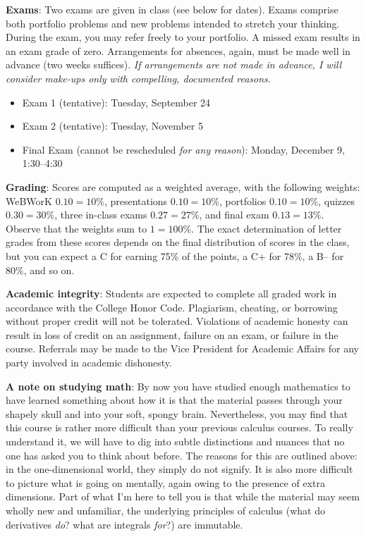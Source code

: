 \documentclass[12pt,twoside]{amsart}
\begin{document}
\textbf{Exams}: Two exams are given in class (see below for dates). Exams comprise both portfolio problems and new problems intended to stretch your thinking. During the exam, you may refer freely to your portfolio. A missed exam results in an exam grade of zero. Arrangements for absences, again, must be made well in advance (two weeks suffices). \emph{If arrangements are not made in advance, I will consider make-ups only with compelling, documented reasons.} 
\begin{itemize}
	\item Exam 1 (tentative): Tuesday, September 24
    \item Exam 2 (tentative): Tuesday, November 5
	\item Final Exam (cannot be rescheduled \emph{for any reason}): Monday, December 9, 1:30--4:30
\end{itemize}

\textbf{Grading}: Scores are computed as a weighted average, with the following weights: WeBWorK $0.10 = 10\%$, presentations $0.10 = 10\%$, portfolios $0.10 = 10\%$, quizzes $0.30 = 30\%$, three in-class exams $0.27 = 27\%$, and final exam $0.13 = 13\%$. Observe that the weights sum to $1 = 100\%$. The exact determination of letter grades from these scores depends on the final distribution of scores in the class, but you can expect a C for earning 75\% of the points, a C+ for 78\%, a B-- for 80\%, and so on.

\textbf{Academic integrity}: Students are expected to complete all graded work in accordance with the College Honor Code. Plagiarism, cheating, or borrowing without proper credit will not be tolerated.  Violations of academic honesty can result in loss of credit on an assignment, failure on an exam, or failure in the course. Referrals may be made to the Vice President for Academic Affairs for any party involved in academic dishonesty.

\textbf{A note on studying math}: By now you have studied enough mathematics to have learned something about how it is that the material passes through your shapely skull and into your soft, spongy brain. Nevertheless, you may find that this course is rather more difficult than your previous calculus courses. To really understand it, we will have to dig into subtle distinctions and nuances that no one has asked you to think about before. The reasons for this are outlined above: in the one-dimensional world, they simply do not signify. It is also more difficult to picture what is going on mentally, again owing to the presence of extra dimensions. Part of what I'm here to tell you is that while the material may seem wholly new and unfamiliar, the underlying principles of calculus (what do derivatives \emph{do}? what are integrals \emph{for}?) are immutable.
\end{document}
